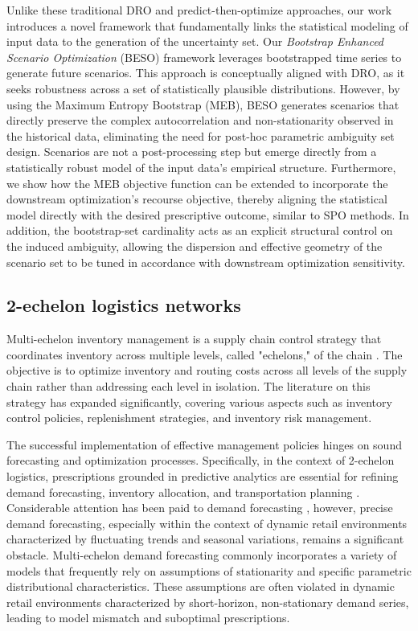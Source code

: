 \documentclass[review,a4paper,fleqn,3p,11pt,authoryear]{elsarticle}
\begin{document}
Unlike these traditional DRO and predict-then-optimize approaches, our work introduces a novel framework that fundamentally links the statistical modeling of input data to the generation of the uncertainty set. Our {\it Bootstrap Enhanced Scenario Optimization} (BESO) framework leverages bootstrapped time series to generate future scenarios. This approach is conceptually aligned with DRO, as it seeks robustness across a set of statistically plausible distributions. However, by using the Maximum Entropy Bootstrap (MEB), BESO generates scenarios that directly preserve the complex autocorrelation and non-stationarity observed in the historical data, eliminating the need for post-hoc parametric ambiguity set design. Scenarios are not a post-processing step but emerge directly from a statistically robust model of the input data's empirical structure. Furthermore, we show how the MEB objective function can be extended to incorporate the downstream optimization's recourse objective, thereby aligning the statistical model directly with the desired prescriptive outcome, similar to SPO methods. In addition, the bootstrap-set cardinality acts as an explicit structural control on the induced ambiguity, allowing the dispersion and effective geometry of the scenario set to be tuned in accordance with downstream optimization sensitivity.

\subsection{2-echelon logistics networks}

Multi-echelon inventory management is a supply chain control strategy that coordinates inventory across multiple levels, called "echelons," of the chain \citep{Clark60}. The objective is to optimize inventory and routing costs across all levels of the supply chain rather than addressing each level in isolation. The literature on this strategy has expanded significantly, covering various aspects such as inventory control policies, replenishment strategies, and inventory risk management.

The successful implementation of effective management policies hinges on sound forecasting and optimization processes. Specifically, in the context of 2-echelon logistics, prescriptions grounded in predictive analytics are essential for refining demand forecasting, inventory allocation, and transportation planning \citep{A01,KK10}. Considerable attention has been paid to demand forecasting \citep{Ma15,Shenstone01}, however, precise demand forecasting, especially within the context of dynamic retail environments characterized by fluctuating trends and seasonal variations, remains a significant obstacle. Multi-echelon demand forecasting commonly incorporates a variety of models that frequently rely on assumptions of stationarity and specific parametric distributional characteristics. These assumptions are often violated in dynamic retail environments characterized by short-horizon, non-stationary demand series, leading to model mismatch and suboptimal prescriptions.
\end{document}
